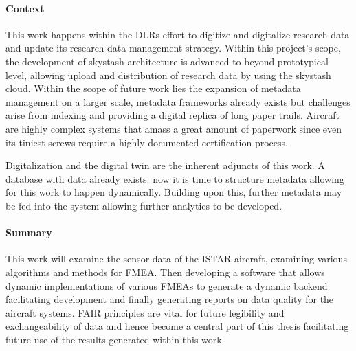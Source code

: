 
\paragraph{Context}
This work happens within the DLRs effort to digitize and digitalize research data and update its research data management strategy.
Within this project's scope, the development of skystash architecture is advanced to beyond prototypical level, allowing upload and distribution of research data by using the skystash cloud.
Within the scope of future work lies the expansion of metadata management on a larger scale, metadata frameworks already exists but challenges arise from indexing and providing a digital replica of long paper trails. Aircraft are highly complex systems that amass a great amount of paperwork since even its tiniest screws require a highly documented certification process.

Digitalization and the digital twin are the inherent adjuncts of this work. A database with data already exists. now it is time to structure metadata allowing for this work to happen dynamically. Building upon this, further metadata may be fed into the system allowing further analytics to be developed.


\paragraph{Summary}

This work will examine the sensor data of the ISTAR aircraft, examining various algorithms and methods for FMEA. Then developing a software that allows dynamic implementations of various FMEAs to generate a dynamic backend facilitating development and finally generating reports on data quality for the aircraft systems. FAIR principles are vital for future legibility and exchangeability of data and hence become a central part of this thesis facilitating future use of the results generated within this work.





